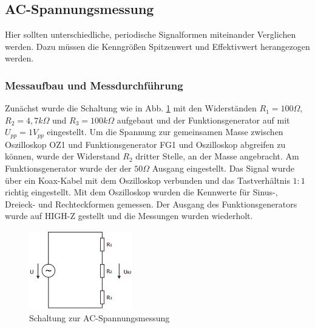 \documentclass[a4paper]{article}
\begin{document}
\subsection{AC-Spannungsmessung}
Hier sollten unterschiedliche, periodische Signalformen miteinander Verglichen werden.
Dazu müssen die Kenngrößen Spitzenwert und Effektivwert herangezogen werden.

\subsubsection{Messaufbau und Messdurchführung}
Zunächst wurde die Schaltung wie in Abb. \ref{fig:5a_ACMessung} mit den 
Widerständen $R_{1}=100\unit{\Omega}$, $R_{2}=4,7\unit{k\Omega}$ und
$R_{3}=100\unit{k\Omega}$ aufgebaut und der Funktionsgenerator auf mit $U_{pp}=1\unit{V_{pp}}$ eingestellt.
Um die Spannung zur gemeinsamen Masse zwischen Oszilloskop OZ1 und Funktionsgenerator FG1
und Oszilloskop abgreifen zu können, wurde der Widerstand $R_{2}$ dritter Stelle,
an der Masse angebracht. Am Funktionsgenerator wurde der der $50\unit{\Omega}$
Ausgang eingestellt. Das Signal wurde über ein Koax-Kabel mit dem Oszilloskop verbunden
und das Tastverhältnis $1:1$ richtig eingestellt.\newline
Mit dem Oszilloskop wurden die Kennwerte für Sinus-, Dreieck- und Rechteckformen gemessen. Der Ausgang des
Funktionsgenerators wurde auf HIGH-Z gestellt und die Messungen wurden wiederholt.
\begin{figure}[h]
    \centering
    \includegraphics[width=0.4\textwidth]{schematics/5a_ACMessung}
    \caption{Schaltung zur AC-Spannungsmessung}
    \label{fig:5a_ACMessung}
\end{figure}
\end{document}
